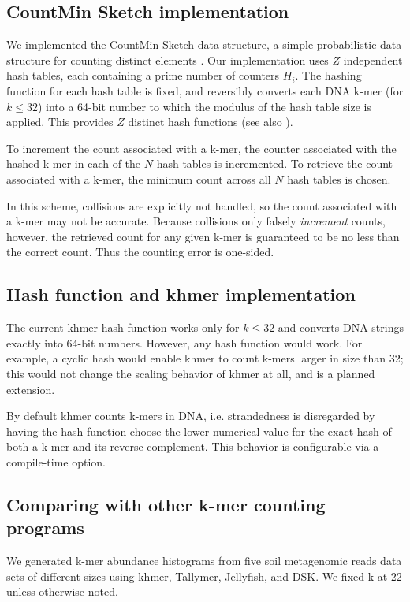 \documentclass[10pt]{article}
\begin{document}
\subsection*{CountMin Sketch implementation}

We implemented the CountMin Sketch data structure, a simple
probabilistic data structure for counting distinct elements
\cite{Cormode2005}.  Our implementation uses $Z$ independent hash
tables, each containing a prime number of counters $H_i$.  The hashing
function for each hash table is fixed, and reversibly converts each
DNA k-mer (for $k \le 32$) into a 64-bit number to which the modulus of
the hash table size is applied.  This provides $Z$ distinct hash
functions (see also \cite{adina2013}).

To increment the count associated with a k-mer, the counter associated
with the hashed k-mer in each of the $N$ hash tables is incremented.
To retrieve the count associated with a k-mer, the minimum count
across all $N$ hash tables is chosen.

In this scheme, collisions are explicitly not handled, so the count
associated with a k-mer may not be accurate. Because collisions only
falsely {\em increment} counts, however, the retrieved count for any
given k-mer is guaranteed to be no less than the correct count.  Thus
the counting error is one-sided.

\subsection*{Hash function and khmer implementation}

The current khmer hash function works only for $k \le 32$ and converts
DNA strings exactly into 64-bit numbers.  However, any hash function
would work. For example, a cyclic hash would enable khmer to count
k-mers larger in size than 32; this would not change the scaling
behavior of khmer at all, and is a planned extension.

By default khmer counts k-mers in DNA, i.e. strandedness is
disregarded by having the hash function choose the lower numerical
value for the exact hash of both a k-mer and its reverse complement.
This behavior is configurable via a compile-time option.

\subsection*{Comparing with other k-mer counting programs}

We generated k-mer abundance histograms from five soil metagenomic reads
data sets of different sizes using khmer, Tallymer, Jellyfish, and DSK.
We fixed k at 22 unless otherwise noted.
\end{document}
